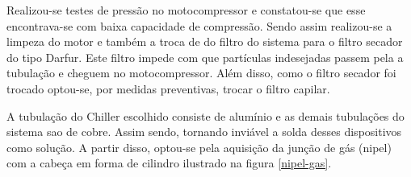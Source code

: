                        Realizou-se testes de pressão no motocompressor e constatou-se que esse encontrava-se
                        com baixa capacidade de compressão. Sendo assim realizou-se a limpeza do motor e
                        também a troca de do filtro do sistema para o filtro secador do tipo Darfur.
                        Este filtro impede com que partículas indesejadas passem pela a tubulação e cheguem
                        no motocompressor. Além disso, como o filtro secador foi trocado optou-se, por medidas
                        preventivas, trocar o filtro capilar. 

                        A tubulação do Chiller escolhido consiste de alumínio e as demais tubulações do
                        sistema sao de cobre. Assim sendo, tornando inviável a solda desses dispositivos como
                        solução. A partir disso, optou-se pela aquisição da junção de gás (nipel)
                        com a cabeça em forma de cilindro ilustrado na figura \ref{nipel-gas}.
                        
